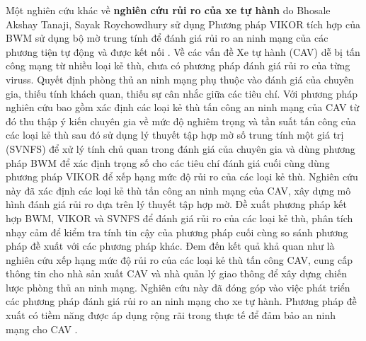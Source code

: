Một nghiên cứu khác về \textbf{nghiên cứu rủi ro của xe tự hành} do Bhosale Akshay Tanaji, Sayak Roychowdhury sử dụng Phương pháp VIKOR tích hợp của BWM sử dụng bộ mờ trung tính để đánh giá rủi ro an ninh mạng của các phương tiện tự động và được kết nối \cite{sciencedirect2}. Về các vấn đề Xe tự hành (CAV) dễ bị tấn công mạng từ nhiều loại kẻ thù, chưa có phương pháp đánh giá rủi ro của từng viruss. Quyết định phòng thủ an ninh mạng phụ thuộc vào đánh giá của chuyên gia, thiếu tính khách quan, thiếu sự cân nhắc giữa các tiêu chí. Với phương pháp nghiên cứu bao gồm xác định các loại kẻ thù tấn công an ninh mạng của CAV từ đó thu thập ý kiến chuyên gia về mức độ nghiêm trọng và tần suất tấn công của các loại kẻ thù sau đó sử dụng lý thuyết tập hợp mờ số trung tính một giá trị (SVNFS) để xử lý tính chủ quan trong đánh giá của chuyên gia và dùng phương pháp BWM để xác định trọng số cho các tiêu chí đánh giá cuối cùng dùng phương pháp VIKOR để xếp hạng mức độ rủi ro của các loại kẻ thù. Nghiên cứu này đã xác định các loại kẻ thù tấn công an ninh mạng của CAV, xây dựng mô hình đánh giá rủi ro dựa trên lý thuyết tập hợp mờ. Đề xuất phương pháp kết hợp BWM, VIKOR và SVNFS để đánh giá rủi ro của các loại kẻ thù, phân tích nhạy cảm để kiểm tra tính tin cậy của phương pháp cuối cùng so sánh phương pháp đề xuất với các phương pháp khác. Đem đến kết quả khả quan như là nghiên cứu xếp hạng mức độ rủi ro của các loại kẻ thù tấn công CAV, cung cấp thông tin cho nhà sản xuất CAV và nhà quản lý giao thông để xây dựng chiến lược phòng thủ an ninh mạng. Nghiên cứu này đã đóng góp vào việc phát triển các phương pháp đánh giá rủi ro an ninh mạng cho xe tự hành. Phương pháp đề xuất có tiềm năng được áp dụng rộng rãi trong thực tế để đảm bảo an ninh mạng cho CAV .

